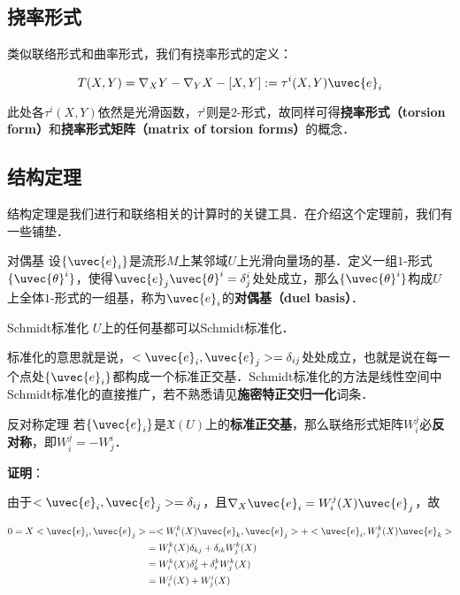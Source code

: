 \subsection{挠率形式}


类似联络形式和曲率形式，我们有挠率形式的定义：

\begin{equation}
T(X, Y)=\nabla_XY-\nabla_YX-[X, Y]:=\tau^i(X, Y)\uvec{e}_i
\end{equation}

此处各$\tau^i(X, Y)$依然是光滑函数，$\tau^i$则是$2$-形式，故同样可得\textbf{挠率形式（torsion form）}和\textbf{挠率形式矩阵（matrix of torsion forms）}的概念．





\subsection{结构定理}

结构定理是我们进行和联络相关的计算时的关键工具．在介绍这个定理前，我们有一些铺垫．


\begin{definition}{对偶基}
设$\{\uvec{e}_i\}$是流形$M$上某邻域$U$上光滑向量场的基．定义一组$1$-形式$\{\uvec{\theta}^i\}$，使得$\uvec{e}_j\uvec{\theta}^i=\delta^i_j$处处成立，那么$\{\uvec{\theta}^i\}$构成$U$上全体$1$-形式的一组基，称为$\uvec{e}_i$的\textbf{对偶基（duel basis）}．
\end{definition}



\begin{theorem}{Schmidt标准化}
$U$上的任何基都可以Schmidt标准化．
\end{theorem}

标准化的意思就是说，$<\uvec{e}_i, \uvec{e}_j>=\delta_{ij}$处处成立，也就是说在每一个点处$\{\uvec{e}_i\}$都构成一个标准正交基．Schmidt标准化的方法是线性空间中Schmidt标准化的直接推广，若不熟悉请见\textbf{施密特正交归一化}词条．

\begin{theorem}{反对称定理}
若$\{\uvec{e}_i\}$是$\mathfrak{X}(U)$上的\textbf{标准正交基}，那么联络形式矩阵$W^j_i$必\textbf{反对称}，即$W^j_i=-W^i_j$．
\end{theorem}

\textbf{证明}：

由于$<\uvec{e}_i, \uvec{e}_j>=\delta_{ij}$，且$\nabla_X\uvec{e}_i=W^j_i(X)\uvec{e}_j$，故

\begin{equation}
\begin{aligned}
0=X<\uvec{e}_i, \uvec{e}_j>&=<W^k_i(X)\uvec{e}_k, \uvec{e}_j>+<\uvec{e}_i, W^k_j(X)\uvec{e}_k>\\
&=W^k_i(X)\delta_{kj}+\delta_{ik}W^k_j(X)\\
&=W^k_i(X)\delta_{k}^j+\delta_{i}^kW^k_j(X)\\
&=W^j_i(X)+W^i_j(X)
\end{aligned}
\end{equation}

